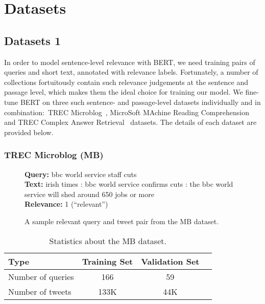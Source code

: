 \chapter{Datasets}

\section{Datasets 1}


In order to model sentence-level relevance with BERT, we need training pairs of queries and short text, annotated with relevance labels.
Fortunately, a number of collections fortuitously contain such relevance judgements at the sentence and passage level, which makes them the ideal choice for training our model.
We fine-tune BERT on three such sentence- and passage-level datasets individually and in combination:\ TREC Microblog~\cite{ounisoverview}, MicroSoft MAchine Reading Comprehension~\cite{nguyen2016msmarco} and TREC Complex Answer Retrieval~\cite{dietz2017trec} datasets.
The details of each dataset are provided below.

\subsection{TREC Microblog (MB)}

\begin{figure}[b!]
	\begin{framed}
		\centering
    		\textbf{Query:} bbc world service staff cuts \\
    		\textbf{Text:} irish times : bbc world service confirms cuts : the bbc world service will shed around 650 jobs or more \\
    		\textbf{Relevance:} 1 (``relevant'')
	\end{framed}
\label{mb-example}
 \caption{A sample relevant query and tweet pair from the MB dataset.}
\end{figure}

\begin{table}[t]
\vspace{0.2cm}
\centering
\begin{tabular}{lccc}
\toprule
\textbf{Type} \mbox{\hspace{0.5cm}} & \textbf{Training Set} \mbox{\hspace{1.0cm}} & \textbf{Validation Set} \mbox{\hspace{1.0cm}} \\
\toprule
Number of queries & 166 & 59 \\
Number  of tweets & 133K & 44K  \\
\bottomrule
\end{tabular}
\vspace{0.2cm}
\caption{Statistics about the MB dataset.}
\label{tab:mb-stats}
\end{table}

